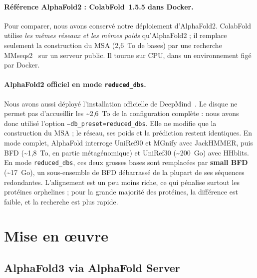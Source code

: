 \paragraph{Référence AlphaFold2 : ColabFold~1.5.5 dans Docker.} Pour comparer, nous avons conservé notre déploiement d'AlphaFold2. ColabFold~\cite{mirdita2022} utilise \emph{les mêmes réseaux et les mêmes poids} qu'AlphaFold2 ; il remplace seulement la construction du MSA (2,6~To de bases) par une recherche MMseqs2~\cite{steinegger2017} sur un serveur public. Il tourne sur CPU, dans un environnement figé par Docker.

\paragraph{AlphaFold2 officiel en mode \texttt{reduced\_dbs}.} Nous avons aussi déployé l'installation officielle de DeepMind~\cite{alphafold_github}. Le disque ne permet pas d'accueillir les \textasciitilde 2,6~To de la configuration complète : nous avons donc utilisé l'option \texttt{--db\_preset=reduced\_dbs}. Elle ne modifie que la construction du MSA ; le réseau, ses poids et la prédiction restent identiques. En mode complet, AlphaFold interroge UniRef90 et MGnify avec JackHMMER, puis BFD (\textasciitilde 1,8~To, en partie métagénomique) et UniRef30 (\textasciitilde 200~Go) avec HHblits. En mode \texttt{reduced\_dbs}, ces deux grosses bases sont remplacées par \textbf{small BFD} (\textasciitilde 17~Go), un sous-ensemble de BFD débarrassé de la plupart de ses séquences redondantes. L'alignement est un peu moins riche, ce qui pénalise surtout les protéines \og orphelines \fg{} ; pour la grande majorité des protéines, la différence est faible, et la recherche est plus rapide.

\section{Mise en œuvre}

\subsection{AlphaFold3 via AlphaFold Server}

